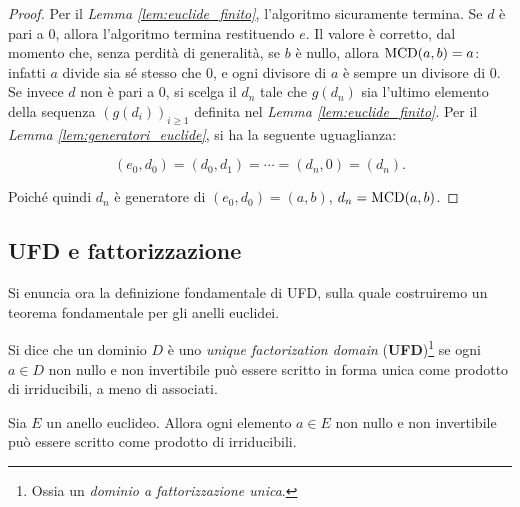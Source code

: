 \begin{proof}
    Per il \textit{Lemma \ref{lem:euclide_finito}}, l'algoritmo sicuramente termina.
    Se $d$ è pari a $0$, allora l'algoritmo termina restituendo $e$. Il valore è
    corretto, dal momento che, senza perdità di generalità, se $b$ è nullo, allora
    $\operatorname{MCD}(a, b)=a$: infatti $a$ divide sia sé stesso che $0$, e ogni divisore di $a$ è
    sempre un divisore di $0$. \\

    Se invece $d$ non è pari a $0$, si scelga il $d_n$ tale che $g(d_n)$ sia l'ultimo
    elemento della sequenza $(g(d_i))_{i\geq1}$ definita nel \textit{Lemma \ref{lem:euclide_finito}}. Per il \textit{Lemma \ref{lem:generatori_euclide}},
    si ha la seguente uguaglianza:

    \[ (e_0, d_0) = (d_0, d_1) = \cdots = (d_n, 0) = (d_n). \]

    \vskip 0.1in

    Poiché quindi $d_n$ è generatore di $(e_0, d_0)=(a,b)$, $d_n = \operatorname{MCD}(a,b)$.
\end{proof}

\subsection{UFD e fattorizzazione}

Si enuncia ora la definizione fondamentale di UFD, sulla
quale costruiremo un teorema fondamentale per gli anelli
euclidei.

\begin{definition}
    Si dice che un dominio $D$ è uno \textit{unique factorization domain} (\textbf{UFD})\footnote{Ossia
        un \textit{dominio a fattorizzazione unica}.} se ogni $a \in D$ non nullo e non invertibile può essere scritto
    in forma unica come prodotto di irriducibili, a meno di associati.
\end{definition}

\begin{lemma}
    \label{lem:fattorizzazione}
    Sia $E$ un anello euclideo. Allora ogni elemento $a \in E$ non nullo e
    non invertibile può essere scritto come prodotto di irriducibili.
\end{lemma}

